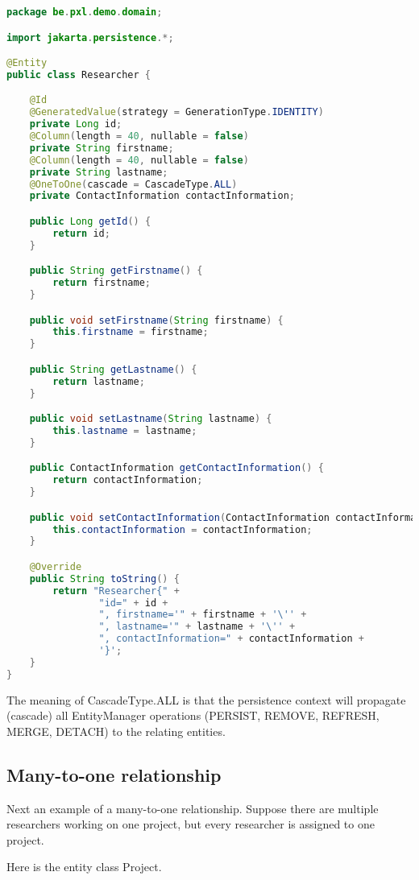 \begin{lstlisting}[frame=single, language=java]
package be.pxl.demo.domain;

import jakarta.persistence.*;

@Entity
public class Researcher {

	@Id
	@GeneratedValue(strategy = GenerationType.IDENTITY)
	private Long id;
	@Column(length = 40, nullable = false)
	private String firstname;
	@Column(length = 40, nullable = false)
	private String lastname;
	@OneToOne(cascade = CascadeType.ALL)
	private ContactInformation contactInformation;

	public Long getId() {
		return id;
	}

	public String getFirstname() {
		return firstname;
	}

	public void setFirstname(String firstname) {
		this.firstname = firstname;
	}

	public String getLastname() {
		return lastname;
	}

	public void setLastname(String lastname) {
		this.lastname = lastname;
	}

	public ContactInformation getContactInformation() {
		return contactInformation;
	}

	public void setContactInformation(ContactInformation contactInformation) {
		this.contactInformation = contactInformation;
	}

	@Override
	public String toString() {
		return "Researcher{" +
				"id=" + id +
				", firstname='" + firstname + '\'' +
				", lastname='" + lastname + '\'' +
				", contactInformation=" + contactInformation +
				'}';
	}
}

\end{lstlisting}

The meaning of CascadeType.ALL is that the persistence context will propagate (cascade) all EntityManager operations (PERSIST, REMOVE, REFRESH, MERGE, DETACH) to the relating entities.

\subsection{Many-to-one relationship}

Next an example of a many-to-one relationship.  
Suppose there are multiple researchers working on one project, but every researcher is assigned to one project. 

Here is the entity class Project.

